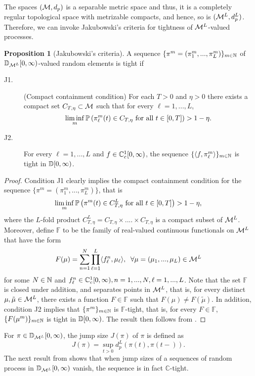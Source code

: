 \documentclass{article}
\theoremstyle{definition}
\newtheorem{proposition}[theorem]{Proposition}
\numberwithin{equation}{section}
\begin{document}
The spaces $(\mathcal{M},d_p)$ is a separable metric space and thus, it is a completely regular topological space with metrizable compacts, and hence, so is $(\mathcal{M}^L,d_p^L)$. Therefore, we can invoke Jakubowski's criteria  \cite[Theorem 4.6]{Jak86} for tightness of $\mathcal{M}^L$-valued processes. 

\begin{proposition}[Jakubowski's criteria]\label{Jakob}
A sequence $\{\pi^m=(\pi^m_1,...,\pi^m_L)\}_{m\in\mathbb{N}}$ of $\mathbb{D}_{\mathcal{M}^L}[0,\infty)$-valued random elements is tight if%
\begin{description}
  \item [J1.] (Compact containment condition) For each $T>0$ and $\eta>0$ there exists a compact set $C_{T,\eta}\subset\mathcal{M}$ such that for every $\ell=1,...,L$,
      \[\liminf_{m}\mathbb{P}\left(\pi_\ell^m(t)\in C_{T,\eta}\text{ for all }t\in[0,T] \right)>1-\eta.\]

  \item [J2.] For every $\ell=1,...,L$ and  $f\in\mathbb{C}^1_c[0,\infty)$, the sequence $\{\langle f,\pi^m_\ell\rangle\}_{m\in\mathbb{N}}$ is tight in $\mathbb{D}[0,\infty)$.
\end{description}
\end{proposition}
\begin{proof}
Condition J1 clearly implies the compact containment condition for the sequence $\{\pi^m=(\pi^m_1,...,\pi^m_L)\}$, that is
\[
\liminf_{m}\mathbb{P}\left(\pi^m(t)\in C_{T,\eta}^L\text{ for all }t\in[0,T] \right)>1-\eta,
\]
where the $L$-fold product $C_{T,\eta}^L=C_{T,\eta}\times....\times C_{T,\eta}$ is a compact subset of $\mathcal{M}^L$. Moreover, define $\mathbb{F}$ to be the family of real-valued continuous functionals on $\mathcal{M}^L$ that have the form 
\[F(\mu)=\sum_{n=1}^N\prod_{\ell=1}^L\langle f^n_\ell,\mu_\ell\rangle,\;\; \forall\mu=(\mu_1,...,\mu_L)\in\mathcal{M}^L\]
for some $N\in\mathbb{N}$ and $f^n_\ell\in\mathbb{C}^1_c[0,\infty),n=1,...,N,\ell=1,...,L$. Note that the set $\mathbb{F}$ is closed under addition, and  separates points in $\mathcal{M}^L$, that is, for every distinct $\mu,\tilde\mu\in\mathcal{M}^L$, there exists a function $F\in\mathbb{F}$ such that $F(\mu)\neq F(\tilde \mu)$. In addition, condition J2 implies that $\{\pi^m\}_{m\in\mathbb{N}}$ is $\mathbb{F}$-tight, that is, for every $F\in\mathbb{F}$, $\{F(\mu^m)\}_{m\in\mathbb{N}}$ is tight in $\mathbb{D}[0,\infty)$. The result then follows from \cite[Theorem 4.6]{Jak86}.
\end{proof}

For $\pi\in\mathbb{D}_{\mathcal{M}^L}[0,\infty)$, the jump size $J(\pi)$ of $\pi$ is defined as
\[
J(\pi)=\sup_{t>0} d_p^L (\pi(t),\pi(t-)).
\]
The next result from \cite{BillingsleyBook} shows that when jump sizes of a sequences of random process in $\mathbb{D}_{\mathcal{M}^L}[0,\infty)$ vanish, the sequence is in fact $\mathbb{C}$-tight.
\end{document}
